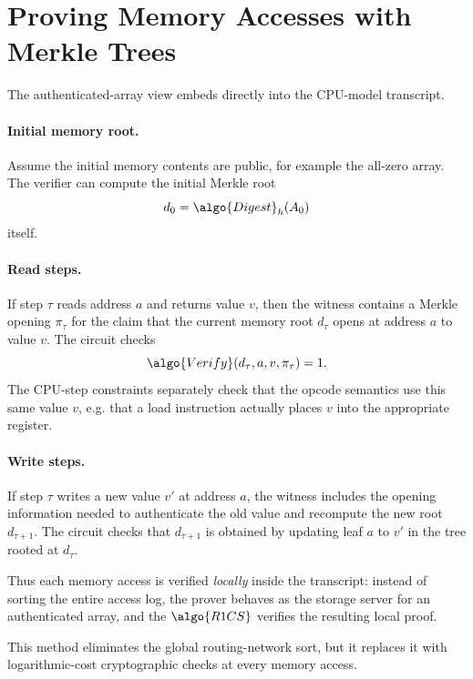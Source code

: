 \documentclass[11pt]{article}
\newcommand{\Digest}{\algo{Digest}}
\newcommand{\VerifyAA}{\algo{Verify}}
\begin{document}
\section{Proving Memory Accesses with Merkle Trees}

The authenticated-array view embeds directly into the CPU-model transcript.

\paragraph{Initial memory root.}
Assume the initial memory contents are public, for example the all-zero array.
The verifier can compute the initial Merkle root
\[
  d_0 = \Digest_h(A_0)
\]
itself.

\paragraph{Read steps.}
If step $\tau$ reads address $a$ and returns value $v$, then the witness
contains a Merkle opening $\pi_\tau$ for the claim that the current memory root
$d_\tau$ opens at address $a$ to value $v$.  The circuit checks
\[
  \VerifyAA(d_\tau, a, v, \pi_\tau) = 1.
\]
The CPU-step constraints separately check that the opcode semantics use this
same value $v$, e.g. that a load instruction actually places $v$ into the
appropriate register.

\paragraph{Write steps.}
If step $\tau$ writes a new value $v'$ at address $a$, the witness includes the
opening information needed to authenticate the old value and recompute the new
root $d_{\tau+1}$.  The circuit checks that $d_{\tau+1}$ is obtained by
updating leaf $a$ to $v'$ in the tree rooted at $d_\tau$.

Thus each memory access is verified \emph{locally} inside the transcript:
instead of sorting the entire access log, the prover behaves as the storage
server for an authenticated array, and the $\algo{R1CS}$ verifies the resulting
local proof.

\begin{remark}
This method eliminates the global routing-network sort, but it replaces it with
logarithmic-cost cryptographic checks at every memory access.
\end{remark}
\end{document}
